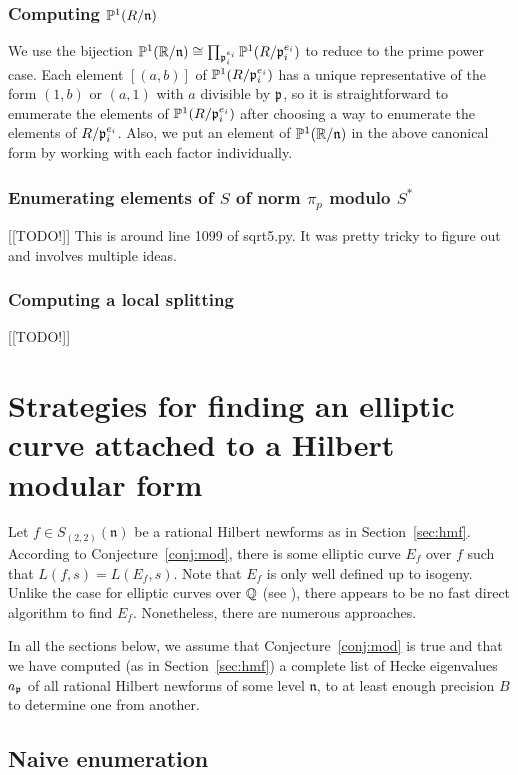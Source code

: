 \documentclass{amsart}
\newcommand{\n}{\mathfrak{n}}
\begin{document}
\subsubsection{Computing $\P^1(R/\n)$}
We use the bijection $\P^1(\R/\n) \isom \prod_{\p_i^{e_i}}
\P^1(R/\p_i^{e_i})$ to reduce to the prime power case.  Each element
$[(a,b)]$ of $\mathbb{P}^1(R/\mathfrak{p}_i^{e_i})$ has a unique representative of the
form $(1,b)$ or $(a,1)$ with $a$ divisible by $\mathfrak{p}$, so it is straightforward
to enumerate the elements of $\mathbb{P}^1(R/\mathfrak{p}_i^{e_i})$ after choosing a way
to enumerate the elements of $R/\mathfrak{p}_i^{e_i}$.  Also, we put an element
of $\P^1(\R/\n)$ in the above canonical form by working with each factor
individually. 


\subsubsection{Enumerating elements of $S$ of norm $\pi_p$ modulo $S^*$}
[[TODO!]]
This is around line 1099 of sqrt5.py.  It was pretty tricky to figure out
and involves multiple ideas.

\subsubsection{Computing a local splitting}
[[TODO!]]



\section{Strategies for finding an elliptic curve attached to a Hilbert modular form}\label{sec:finding}
Let $f\in S_{(2,2)}(\n)$ be a rational Hilbert newforms as in
Section~\ref{sec:hmf}.  According to Conjecture~\ref{conj:mod}, there
is some elliptic curve $E_f$ over $f$ such that $L(f,s) = L(E_f,s)$.
Note that $E_f$ is only well defined up to isogeny.  Unlike the case
for elliptic curves over $\mathbb{Q}$ (see \cite{cremona:algs}), there appears
to be no fast direct algorithm to find $E_f$.  Nonetheless, there are
numerous approaches.

In all the sections below, we assume that Conjecture~\ref{conj:mod} is
true and that we have computed (as in Section~\ref{sec:hmf}) a
complete list of Hecke eigenvalues $a_{\mathfrak{p}}$ of all rational Hilbert
newforms of some level $\n$, to at least enough precision $B$ to determine
one from another.

\subsection{Naive enumeration}\label{sec:naive}
\end{document}
